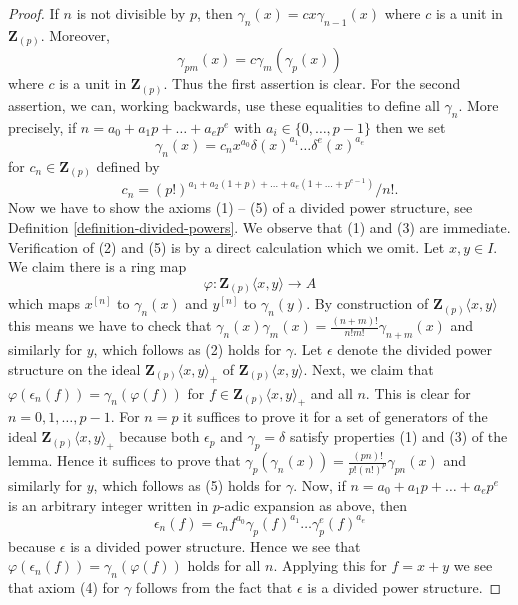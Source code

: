 \begin{proof}
If $n$ is not divisible by $p$, then $\gamma_n(x) = c x \gamma_{n - 1}(x)$
where $c$ is a unit in $\mathbf{Z}_{(p)}$. Moreover,
$$
\gamma_{pm}(x) = c \gamma_m(\gamma_p(x))
$$
where $c$ is a unit in $\mathbf{Z}_{(p)}$. Thus the first assertion is clear.
For the second assertion, we can, working backwards, use these equalities
to define all $\gamma_n$. More precisely, if
$n = a_0 + a_1p + \ldots + a_e p^e$ with $a_i \in \{0, \ldots, p - 1\}$ then
we set
$$
\gamma_n(x) = c_n x^{a_0} \delta(x)^{a_1} \ldots \delta^e(x)^{a_e}
$$
for $c_n \in \mathbf{Z}_{(p)}$ defined by
$$
c_n =
{(p!)^{a_1 + a_2(1 + p) + \ldots + a_e(1 + \ldots + p^{e - 1})}}/{n!}.
$$
Now we have to show the axioms (1) -- (5) of a divided power structure, see
Definition \ref{definition-divided-powers}. We observe that (1) and (3) are
immediate. Verification of (2) and (5) is by a direct calculation which
we omit. Let $x, y \in I$. We claim there is a ring map
$$
\varphi : \mathbf{Z}_{(p)}\langle x, y \rangle \longrightarrow A
$$
which maps $x^{[n]}$ to $\gamma_n(x)$ and $y^{[n]}$ to $\gamma_n(y)$.
By construction of $\mathbf{Z}_{(p)}\langle x, y \rangle$ this means
we have to check that
$\gamma_n(x)\gamma_m(x) = \frac{(n + m)!}{n!m!} \gamma_{n + m}(x)$
and similarly for $y$, which follows as (2) holds for $\gamma$.
Let $\epsilon$ denote the divided power structure on the
ideal $\mathbf{Z}_{(p)}\langle x, y\rangle_{+}$ of
$\mathbf{Z}_{(p)}\langle x, y\rangle$.
Next, we claim that $\varphi(\epsilon_n(f)) = \gamma_n(\varphi(f))$
for $f \in \mathbf{Z}_{(p)}\langle x, y\rangle_{+}$ and all $n$.
This is clear for $n = 0, 1, \ldots, p - 1$. For $n = p$ it suffices
to prove it for a set of generators of the ideal
$\mathbf{Z}_{(p)}\langle x, y\rangle_{+}$ because both $\epsilon_p$
and $\gamma_p = \delta$ satisfy properties (1) and (3) of the lemma.
Hence it suffices to prove that
$\gamma_p(\gamma_n(x)) = \frac{(pn)!}{p!(n!)^p}\gamma_{pn}(x)$ and
similarly for $y$, which follows as (5) holds for $\gamma$.
Now, if $n = a_0 + a_1p + \ldots + a_e p^e$
is an arbitrary integer written in $p$-adic expansion as above, then
$$
\epsilon_n(f) = 
c_n f^{a_0} \gamma_p(f)^{a_1} \ldots \gamma_p^e(f)^{a_e}
$$
because $\epsilon$ is a divided power structure. Hence we see that
$\varphi(\epsilon_n(f)) = \gamma_n(\varphi(f))$ holds for all $n$.
Applying this for $f = x + y$ we see that axiom (4) for $\gamma$
follows from the fact that $\epsilon$ is a divided power structure.
\end{proof}








